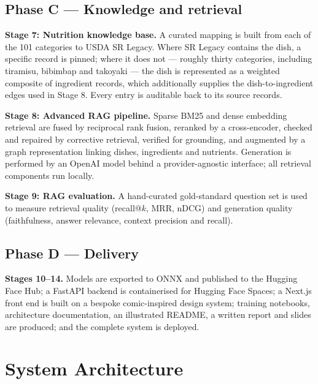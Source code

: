 \documentclass[12pt,a4paper,oneside]{report}
\begin{document}
\section{Phase C --- Knowledge and retrieval}

\textbf{Stage 7: Nutrition knowledge base.} A curated mapping is built from each
of the 101 categories to USDA SR Legacy. Where SR Legacy contains the dish, a
specific record is pinned; where it does not --- roughly thirty categories,
including tiramisu, bibimbap and takoyaki --- the dish is represented as a
weighted composite of ingredient records, which additionally supplies the
dish-to-ingredient edges used in Stage 8. Every entry is auditable back to its
source records.

\textbf{Stage 8: Advanced RAG pipeline.} Sparse BM25 and dense embedding
retrieval are fused by reciprocal rank fusion, reranked by a cross-encoder,
checked and repaired by corrective retrieval, verified for grounding, and
augmented by a graph representation linking dishes, ingredients and nutrients.
Generation is performed by an OpenAI model behind a provider-agnostic interface;
all retrieval components run locally.

\textbf{Stage 9: RAG evaluation.} A hand-curated gold-standard question set is
used to measure retrieval quality (recall@$k$, MRR, nDCG) and generation quality
(faithfulness, answer relevance, context precision and recall).

\section{Phase D --- Delivery}

\textbf{Stages 10--14.} Models are exported to ONNX and published to the Hugging
Face Hub; a FastAPI backend is containerised for Hugging Face Spaces; a Next.js
front end is built on a bespoke comic-inspired design system; training notebooks,
architecture documentation, an illustrated README, a written report and slides
are produced; and the complete system is deployed.

\chapter{System Architecture}
\end{document}
